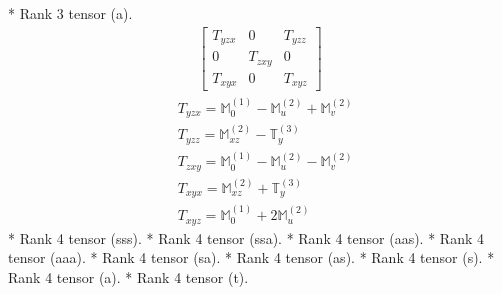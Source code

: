 \documentclass[fleqn,8pt,landscape]{jsarticle}
\begin{document}
* Rank 3 tensor (a).
\begin{align*}
\begin{bmatrix} T_{yzx} & 0 & T_{yzz} \\ 0 & T_{zxy} & 0 \\ T_{xyx} & 0 & T_{xyz} \end{bmatrix}
\end{align*}
\begin{align*}
& T_{yzx} = \mathbb{M}_{0}^{(1)} - \mathbb{M}_{u}^{(2)} + \mathbb{M}_{v}^{(2)} \\
& T_{yzz} = \mathbb{M}_{xz}^{(2)} - \mathbb{T}_{y}^{(3)} \\
& T_{zxy} = \mathbb{M}_{0}^{(1)} - \mathbb{M}_{u}^{(2)} - \mathbb{M}_{v}^{(2)} \\
& T_{xyx} = \mathbb{M}_{xz}^{(2)} + \mathbb{T}_{y}^{(3)} \\
& T_{xyz} = \mathbb{M}_{0}^{(1)} + 2 \mathbb{M}_{u}^{(2)}
\end{align*}
* Rank 4 tensor (sss).
* Rank 4 tensor (ssa).
* Rank 4 tensor (aas).
* Rank 4 tensor (aaa).
* Rank 4 tensor (sa).
* Rank 4 tensor (as).
* Rank 4 tensor (s).
* Rank 4 tensor (a).
* Rank 4 tensor (t).
\end{document}
